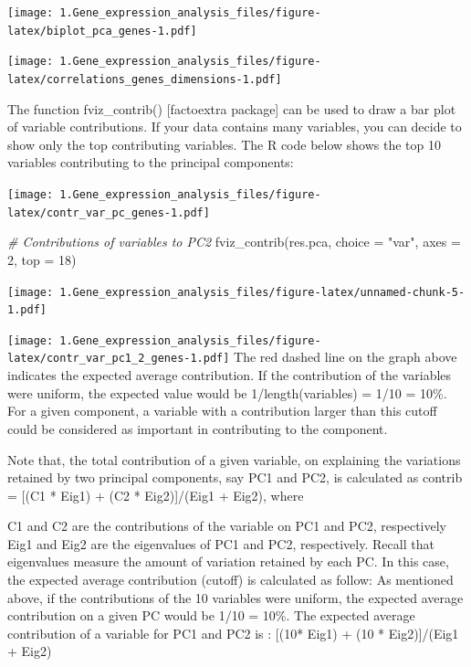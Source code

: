 \documentclass[
]{article}
\newenvironment{Shaded}{\begin{snugshade}}{\end{snugshade}}
\newcommand{\AttributeTok}[1]{\textcolor[rgb]{0.77,0.63,0.00}{#1}}
\newcommand{\CommentTok}[1]{\textcolor[rgb]{0.56,0.35,0.01}{\textit{#1}}}
\newcommand{\DecValTok}[1]{\textcolor[rgb]{0.00,0.00,0.81}{#1}}
\newcommand{\FunctionTok}[1]{\textcolor[rgb]{0.00,0.00,0.00}{#1}}
\newcommand{\NormalTok}[1]{#1}
\newcommand{\StringTok}[1]{\textcolor[rgb]{0.31,0.60,0.02}{#1}}
\begin{document}
\texttt{[image: 1.Gene\_expression\_analysis\_files/figure-latex/biplot\_pca\_genes-1.pdf]}

\texttt{[image: 1.Gene\_expression\_analysis\_files/figure-latex/correlations\_genes\_dimensions-1.pdf]}

The function fviz\_contrib() {[}factoextra package{]} can be used to
draw a bar plot of variable contributions. If your data contains many
variables, you can decide to show only the top contributing variables.
The R code below shows the top 10 variables contributing to the
principal components:

\texttt{[image: 1.Gene\_expression\_analysis\_files/figure-latex/contr\_var\_pc\_genes-1.pdf]}

\begin{Shaded}
\begin{Highlighting}[]
\CommentTok{\# Contributions of variables to PC2}
\FunctionTok{fviz\_contrib}\NormalTok{(res.pca, }\AttributeTok{choice =} \StringTok{"var"}\NormalTok{, }\AttributeTok{axes =} \DecValTok{2}\NormalTok{, }\AttributeTok{top =} \DecValTok{18}\NormalTok{)}
\end{Highlighting}
\end{Shaded}

\texttt{[image: 1.Gene\_expression\_analysis\_files/figure-latex/unnamed-chunk-5-1.pdf]}

\texttt{[image: 1.Gene\_expression\_analysis\_files/figure-latex/contr\_var\_pc1\_2\_genes-1.pdf]}
The red dashed line on the graph above indicates the expected average
contribution. If the contribution of the variables were uniform, the
expected value would be 1/length(variables) = 1/10 = 10\%. For a given
component, a variable with a contribution larger than this cutoff could
be considered as important in contributing to the component.

Note that, the total contribution of a given variable, on explaining the
variations retained by two principal components, say PC1 and PC2, is
calculated as contrib = {[}(C1 * Eig1) + (C2 * Eig2){]}/(Eig1 + Eig2),
where

C1 and C2 are the contributions of the variable on PC1 and PC2,
respectively Eig1 and Eig2 are the eigenvalues of PC1 and PC2,
respectively. Recall that eigenvalues measure the amount of variation
retained by each PC. In this case, the expected average contribution
(cutoff) is calculated as follow: As mentioned above, if the
contributions of the 10 variables were uniform, the expected average
contribution on a given PC would be 1/10 = 10\%. The expected average
contribution of a variable for PC1 and PC2 is : {[}(10* Eig1) + (10 *
Eig2){]}/(Eig1 + Eig2)
\end{document}
